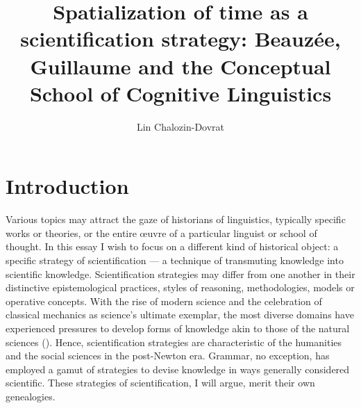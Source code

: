 \documentclass[output=paper]{langsci/langscibook}
\author{Lin Chalozin-Dovrat
\affiliation{Cohn Institute for the History and Philosophy of Science and Ideas, Tel Aviv University}\orcid{}}
\title{Spatialization of time as a scientification strategy:\newline 
Beauzée, Guillaume and the Conceptual School of Cognitive Linguistics}
\begin{document}
\maketitle

\section{Introduction} 
Various topics may attract the gaze of historians of linguistics, typically specific works or theories, or the entire œuvre of a particular linguist or school of thought. In this essay I wish to focus on a different kind of historical object: a specific strategy of scientification — a technique of transmuting knowledge into scientific knowledge. Scientification strategies may differ from one another in their distinctive epistemological practices, styles of reasoning, methodologies, models or operative concepts. With the rise of modern science and the celebration of classical mechanics as science’s ultimate exemplar, the most diverse domains have experienced pressures to develop forms of knowledge akin to those of the natural sciences (\citealt{bod_making_2014}). Hence, scientification strategies are characteristic of the humanities and the social sciences in the post-Newton era. Grammar, no exception, has employed a gamut of strategies to devise knowledge in ways generally considered scientific. These strategies of scientification, I will argue, merit their own genealogies.
\end{document}
